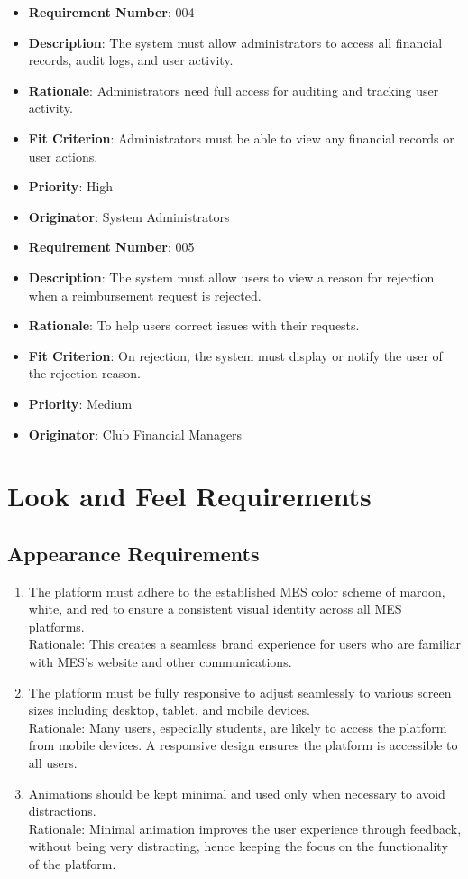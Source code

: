 \documentclass[12pt]{article}
\begin{document}
\begin{itemize}
  \bigskip

  \item \textbf{Requirement Number}: 004
  \item \textbf{Description}: The system must allow administrators to access all financial records, audit logs, and user activity.
  \item \textbf{Rationale}: Administrators need full access for auditing and tracking user activity.
  \item \textbf{Fit Criterion}: Administrators must be able to view any financial records or user actions.
  \item \textbf{Priority}: High
  \item \textbf{Originator}: System Administrators
  
  \bigskip
  
  \item \textbf{Requirement Number}: 005
  \item \textbf{Description}: The system must allow users to view a reason for rejection when a reimbursement request is rejected.
  \item \textbf{Rationale}: To help users correct issues with their requests.
  \item \textbf{Fit Criterion}: On rejection, the system must display or notify the user of the rejection reason.
  \item \textbf{Priority}: Medium
  \item \textbf{Originator}: Club Financial Managers

\end{itemize}

\section{Look and Feel Requirements}
\subsection{Appearance Requirements}
\begin{enumerate}
  \item The platform must adhere to the established MES color scheme of maroon, white, and red to ensure a consistent visual identity across all MES platforms. \\
  Rationale: This creates a seamless brand experience for users who are familiar with MES's website and other communications.
  \item The platform must be fully responsive to adjust seamlessly to various screen sizes including desktop, tablet, and mobile devices. \\
  Rationale: Many users, especially students, are likely to access the platform from mobile devices. A responsive design ensures the platform is accessible to all users.
  \item  Animations should be kept minimal and used only when necessary to avoid distractions. \\
  Rationale: Minimal animation improves the user experience through feedback, without being very distracting, hence keeping the focus on the functionality of the platform.
\end{enumerate}
\end{document}
